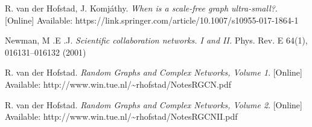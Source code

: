 \documentclass[a4paper]{article}
\begin{document}
\begin{thebibliography}{9}

R. van der Hofstad, J. Komjáthy. \emph{When is a scale-free graph ultra-small?}. [Online] Available: https://link.springer.com/article/10.1007/s10955-017-1864-1

Newman, M .E .J. \emph{Scientific collaboration networks. I and II.} Phys. Rev. E 64(1), 016131–016132 (2001)

R. van der Hofstad. \emph{Random Graphs and Complex Networks, Volume 1}. [Online] Available: http://www.win.tue.nl/\~{}rhofstad/NotesRGCN.pdf

R. van der Hofstad. \emph{Random Graphs and Complex Networks, Volume 2}. [Online] Available: http://www.win.tue.nl/\~{}rhofstad/NotesRGCNII.pdf

	
\end{thebibliography}
\end{document}
